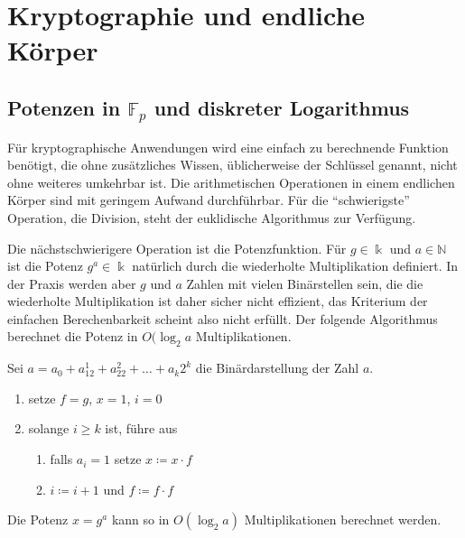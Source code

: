 %
%
%

\section{Kryptographie und endliche Körper
\label{buch:section:kryptographie-und-endliche-koerper}}

\subsection{Potenzen in $\mathbb{F}_p$ und diskreter Logarithmus
\label{buch:subsection:potenzen-diskreter-logarithmus}}
Für kryptographische Anwendungen wird eine einfach zu berechnende
Funktion benötigt,
die ohne zusätzliches Wissen, üblicherweise der Schlüssel genannt,
nicht ohne weiteres umkehrbar ist.
Die arithmetischen Operationen in einem endlichen Körper sind
mit geringem Aufwand durchführbar.
Für die ``schwierigste'' Operation, die Division, steht der
euklidische Algorithmus zur Verfügung.

Die nächstschwierigere Operation ist die Potenzfunktion.
Für $g\in \Bbbk$ und $a\in\mathbb{N}$ ist die Potenz $g^a\in\Bbbk$
natürlich durch die wiederholte Multiplikation definiert.
In der Praxis werden aber $g$ und $a$ Zahlen mit vielen Binärstellen
sein, die die wiederholte Multiplikation ist daher sicher nicht
effizient, das Kriterium der einfachen Berechenbarkeit scheint
also nicht erfüllt.
Der folgende Algorithmus berechnet die Potenz in $O(\log_2 a$
Multiplikationen.

\begin{algorithmus}
\label{buch:crypto:algo:divide-and-conquer}
Sei $a=a_0 + a_12^1 + a_22^2 + \dots + a_k2^k$ die Binärdarstellung
der Zahl $a$.
\begin{enumerate}
\item setze $f=g$, $x=1$, $i=0$
\label{divide-and-conquer-1}
\item solange $i\ge k$ ist, führe aus
\label{divide-and-conquer-2}
\begin{enumerate}
\item
\label{divide-and-conquer-3}
falls $a_i=1$ setze $x \coloneqq x \cdot f$
\item
\label{divide-and-conquer-4}
$i \coloneqq i+1$ und $f\coloneqq f\cdot f$
\end{enumerate}
\end{enumerate}
Die Potenz $x=g^a$ kann so in $O(\log_2a)$ Multiplikationen
berechnet werden.
\end{algorithmus}

